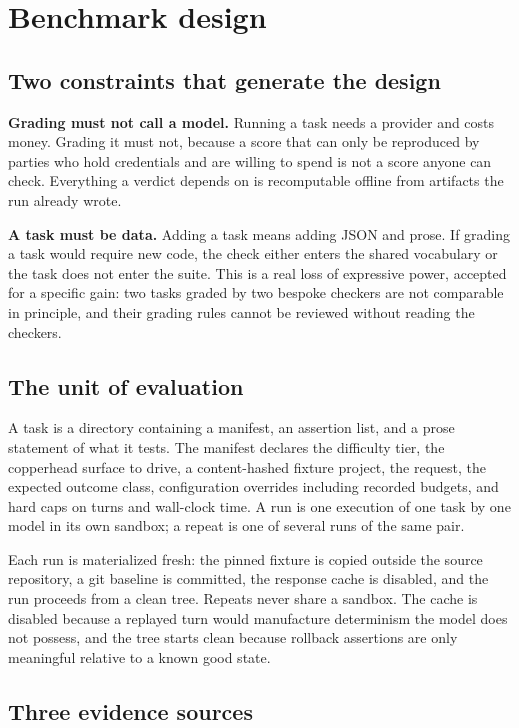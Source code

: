 \section{Benchmark design}
\label{sec:design}

\subsection{Two constraints that generate the design}

\textbf{Grading must not call a model.} Running a task needs a provider and costs money. Grading it must not, because a score that can only be reproduced by parties who hold credentials and are willing to spend is not a score anyone can check. Everything a verdict depends on is recomputable offline from artifacts the run already wrote.

\textbf{A task must be data.} Adding a task means adding JSON and prose. If grading a task would require new code, the check either enters the shared vocabulary or the task does not enter the suite. This is a real loss of expressive power, accepted for a specific gain: two tasks graded by two bespoke checkers are not comparable in principle, and their grading rules cannot be reviewed without reading the checkers.

\subsection{The unit of evaluation}

A task is a directory containing a manifest, an assertion list, and a prose statement of what it tests. The manifest declares the difficulty tier, the copperhead surface to drive, a content-hashed fixture project, the request, the expected outcome class, configuration overrides including recorded budgets, and hard caps on turns and wall-clock time. A run is one execution of one task by one model in its own sandbox; a repeat is one of several runs of the same pair.

Each run is materialized fresh: the pinned fixture is copied outside the source repository, a git baseline is committed, the response cache is disabled, and the run proceeds from a clean tree. Repeats never share a sandbox. The cache is disabled because a replayed turn would manufacture determinism the model does not possess, and the tree starts clean because rollback assertions are only meaningful relative to a known good state.

\subsection{Three evidence sources}

